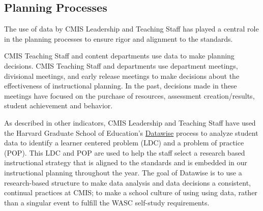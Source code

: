 \subsection{Planning Processes}



\begin{findings}
The use of data by CMIS Leadership and Teaching Staff has played a central role in the planning processes to ensure rigor and alignment to the standards. 


CMIS Teaching Staff and content departments use data to make planning decisions. CMIS Teaching Staff and departments use department meetings, divisional meetings, and early release meetings to make decisions about the effectiveness of instructional planning. In the past, decisions made in these meetings have focused on the purchase of resources, assessment creation/results, student achievement and behavior. 

As described in other indicators, CMIS Leadership and Teaching Staff have used the Harvard Graduate School of Education’s \href{https://docs.google.com/a/cmis.ac.th/presentation/d/1omzyjfwf5fazGCSuvw7dDQn4eqhpOIaldeLXY7-6PYQ/edit?usp=sharing}{Datawise} process to analyze student data to identify a learner centered problem (LDC) and a problem of practice (POP). This LDC and POP are used to help the staff select a research based instructional strategy that is aligned to the standards and is embedded in our instructional planning  throughout the year. The goal of Datawise is to use a research-based structure to make data analysis and data decisions a consistent, continual practices at CMIS; to make a school culture of using using data, rather than a singular event to fulfill the WASC self-study requirements. 



\end{findings}
